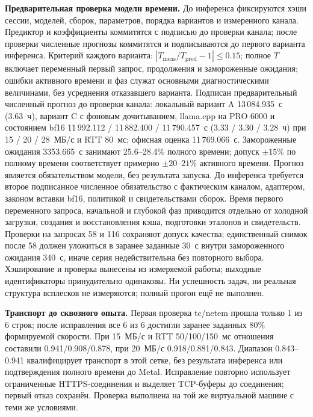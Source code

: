 \textbf{Предварительная проверка модели времени.} До инференса фиксируются хэши сессии, моделей,
сборок, параметров, порядка вариантов и измеренного канала.
Предиктор и коэффициенты коммитятся с подписью до проверки канала; после проверки численные прогнозы
коммитятся и подписываются до первого варианта инференса.
Критерий каждого варианта: $|T_{\mathrm{meas}}/T_{\mathrm{pred}}-1|\le0.15$;
полное $T$ включает переменный первый запрос, продолжения и замороженные ожидания;
ошибки активного времени и фаз служат основными диагностическими величинами, без усреднения отказавшего варианта.
Подписан предварительный численный прогноз до проверки канала: локальный вариант A 13\,084.935~с (3.63~ч),
вариант C с фоновым дочитыванием, llama.cpp на PRO 6000 и состоянием bf16
11\,992.112 / 11\,882.400 / 11\,790.457~с (3.33 / 3.30 / 3.28~ч)
при 15 / 20 / 28~МБ/с и RTT 80~мс; офисная оценка 11\,769.066~с.
Замороженные ожидания 3353.665~с занимают 25.6--28.4\% полного времени;
допуск $\pm15\%$ по полному времени соответствует примерно $\pm20$--$21\%$ активного времени.
Прогноз является обязательством модели, без результата запуска.
До инференса требуется второе подписанное численное обязательство с фактическим каналом,
адаптером, законом вставки bf16, политикой и свидетельствами сборок.
Время первого переменного запроса, начальной и глубокой фаз приводится отдельно от холодной загрузки,
создания и восстановления кэша, подготовки эталонов и свидетельств.
Проверки на запросах 58 и 116 сохраняют допуск качества; единственный снимок после 58 должен уложиться
в заранее заданные 30~с внутри замороженного ожидания 340~с, иначе серия недействительна без повторного выбора.
Хэширование и проверка вынесены из измеряемой работы; выходные идентификаторы принудительно одинаковы.
Ни успешность задач, ни реальная структура всплесков не измеряются; полный прогон ещё не выполнен.

\textbf{Транспорт до сквозного опыта.} Первая проверка tc/netem прошла только 1 из 6 строк;
после исправления все 6 из 6 достигли заранее заданных 80\% формируемой скорости.
При 15~МБ/с и RTT 50/100/150~мс отношения составили 0.941/0.908/0.878,
при 20~МБ/с 0.918/0.881/0.843. Диапазон 0.843--0.941 квалифицирует транспорт в этой сетке,
без результата инференса или подтверждения полного времени до Metal.
Исправление повторно использует ограниченные HTTPS-соединения и выделяет TCP-буферы до соединения;
первый отказ сохранён. Проверка выполнена на той же виртуальной машине с теми же условиями.

